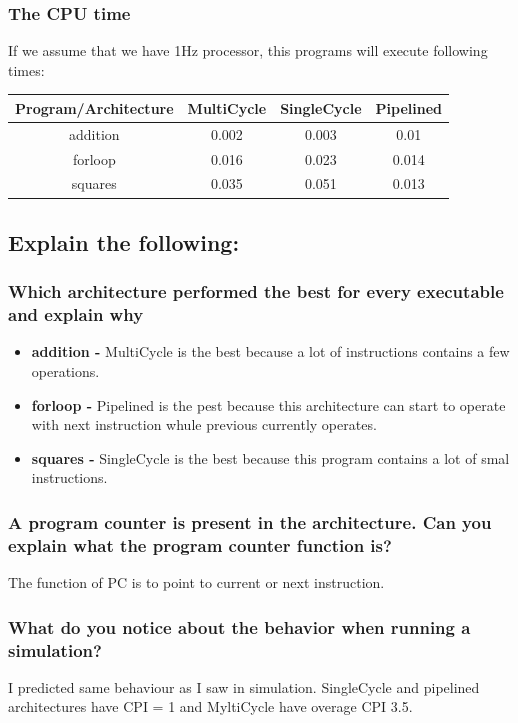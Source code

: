 \documentclass[a4paper,11pt]{article}
\begin{document}
\subsubsection{The CPU time}
If we assume that we have 1Hz processor, this programs will execute following times:
\begin{center}
\begin{tabular}{|c|c|c|c|}
\hline
Program/Architecture & MultiCycle & SingleCycle & Pipelined  \\ \hline \hline 
addition & 0.002 & 0.003 & 0.01  \\ \hline 
forloop & 0.016 & 0.023 &  0.014 \\ \hline 
squares & 0.035 & 0.051 &  0.013 \\ \hline 
\end{tabular}
\end{center}

\subsection{Explain the following:}
\subsubsection{Which architecture performed the best for every executable and explain why}
\begin{itemize}
  \item \textbf{addition - } MultiCycle is the best because a lot of instructions contains a few operations.
  \item \textbf{forloop - } Pipelined is the pest because this architecture can start to operate with next instruction whule previous currently operates.
  \item \textbf{squares - } SingleCycle is the best because this program contains a lot of smal instructions.
\end{itemize}
\subsubsection{A program counter is present in the architecture. Can you explain what the program counter function is?}
The function of PC is to point to current or next instruction.
\subsubsection{What do you notice about the behavior when running a simulation?}
I predicted same behaviour as I saw in simulation. SingleCycle and pipelined architectures have CPI = 1 and MyltiCycle have overage CPI 3.5.
\end{document}
